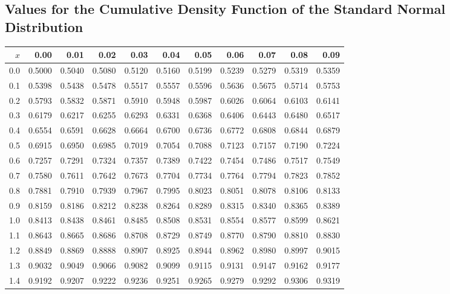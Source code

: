 \documentclass[12pt,a4paper,leqno]{report}
\theoremstyle{plain}
\theoremstyle{definition}
\begin{document}
\subsection*{Values for the Cumulative Density Function of the Standard Normal Distribution}
\begin{table}[ht]
	\centering
	\begin{tabular}{rrrrrrrrrrr}
		\hline
		$x$ & 0.00 & 0.01 & 0.02 & 0.03 & 0.04 & 0.05 & 0.06 & 0.07 & 0.08 & 0.09 \\ 
		\hline
		0.0 & 0.5000 & 0.5040 & 0.5080 & 0.5120 & 0.5160 & 0.5199 & 0.5239 & 0.5279 & 0.5319 & 0.5359 \\ 
		0.1 & 0.5398 & 0.5438 & 0.5478 & 0.5517 & 0.5557 & 0.5596 & 0.5636 & 0.5675 & 0.5714 & 0.5753 \\ 
		0.2 & 0.5793 & 0.5832 & 0.5871 & 0.5910 & 0.5948 & 0.5987 & 0.6026 & 0.6064 & 0.6103 & 0.6141 \\ 
		0.3 & 0.6179 & 0.6217 & 0.6255 & 0.6293 & 0.6331 & 0.6368 & 0.6406 & 0.6443 & 0.6480 & 0.6517 \\ 
		0.4 & 0.6554 & 0.6591 & 0.6628 & 0.6664 & 0.6700 & 0.6736 & 0.6772 & 0.6808 & 0.6844 & 0.6879 \\ 
		0.5 & 0.6915 & 0.6950 & 0.6985 & 0.7019 & 0.7054 & 0.7088 & 0.7123 & 0.7157 & 0.7190 & 0.7224 \\ 
		0.6 & 0.7257 & 0.7291 & 0.7324 & 0.7357 & 0.7389 & 0.7422 & 0.7454 & 0.7486 & 0.7517 & 0.7549 \\ 
		0.7 & 0.7580 & 0.7611 & 0.7642 & 0.7673 & 0.7704 & 0.7734 & 0.7764 & 0.7794 & 0.7823 & 0.7852 \\ 
		0.8 & 0.7881 & 0.7910 & 0.7939 & 0.7967 & 0.7995 & 0.8023 & 0.8051 & 0.8078 & 0.8106 & 0.8133 \\ 
		0.9 & 0.8159 & 0.8186 & 0.8212 & 0.8238 & 0.8264 & 0.8289 & 0.8315 & 0.8340 & 0.8365 & 0.8389 \\ 
		1.0 & 0.8413 & 0.8438 & 0.8461 & 0.8485 & 0.8508 & 0.8531 & 0.8554 & 0.8577 & 0.8599 & 0.8621 \\ 
		1.1 & 0.8643 & 0.8665 & 0.8686 & 0.8708 & 0.8729 & 0.8749 & 0.8770 & 0.8790 & 0.8810 & 0.8830 \\ 
		1.2 & 0.8849 & 0.8869 & 0.8888 & 0.8907 & 0.8925 & 0.8944 & 0.8962 & 0.8980 & 0.8997 & 0.9015 \\ 
		1.3 & 0.9032 & 0.9049 & 0.9066 & 0.9082 & 0.9099 & 0.9115 & 0.9131 & 0.9147 & 0.9162 & 0.9177 \\ 
		1.4 & 0.9192 & 0.9207 & 0.9222 & 0.9236 & 0.9251 & 0.9265 & 0.9279 & 0.9292 & 0.9306 & 0.9319 \\ 

\end{tabular}
\end{table}
\end{document}
